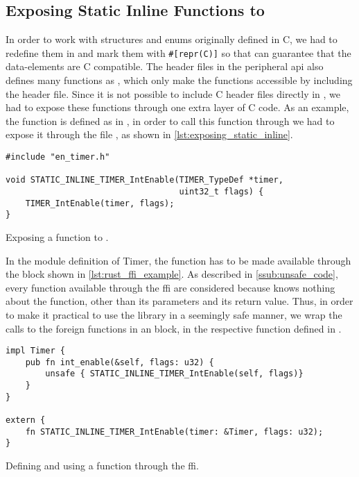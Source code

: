 \subsection{Exposing Static Inline Functions to {\rust}}

In order to work with structures and enums originally defined in C, we had to redefine them in {\rust} and mark them with \texttt{\#[repr(C)]} so that {\rust} can guarantee that the data-elements are C compatible.
The header files in the peripheral \gls{api} also defines many functions as , which only make the functions accessible by including the header file.
Since it is not possible to include C header files directly in {\rust}, we had to expose these functions through one extra layer of C code.
As an example, the  function is defined as  in , in order to call this function through {\rust} we had to expose it through the file , as shown in \autoref{lst:exposing_static_inline}.

\begin{listing}[h]
\begin{verbatim}
#include "en_timer.h"

void STATIC_INLINE_TIMER_IntEnable(TIMER_TypeDef *timer,
                                   uint32_t flags) {
    TIMER_IntEnable(timer, flags);
}
\end{verbatim}
\caption{Exposing a  function to {\rust}.}
\label{lst:exposing_static_inline}
\end{listing}

In the {\rust} module definition of Timer, the function has to be made available through the  block shown in \autoref{lst:rust_ffi_example}.
As described in \autoref{ssub:unsafe_code}, every function available through the \gls{ffi} are considered {\unsafe} because {\rust} knows nothing about the function, other than its parameters and its return value.
Thus, in order to make it practical to use the library in a seemingly safe manner, we wrap the calls to the foreign functions in an {\unsafe} block, in the respective function defined in {\rust}.

\begin{listing}[h]
\begin{verbatim}
impl Timer {
    pub fn int_enable(&self, flags: u32) {
        unsafe { STATIC_INLINE_TIMER_IntEnable(self, flags)}
    }
}

extern {
    fn STATIC_INLINE_TIMER_IntEnable(timer: &Timer, flags: u32);
}
\end{verbatim}
\caption{Defining and using a function through the {\rust} \gls{ffi}.}
\label{lst:rust_ffi_example}
\end{listing}

